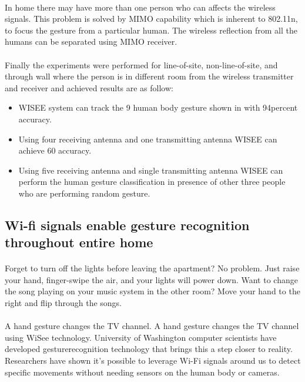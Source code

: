 \documentclass[a4paper,12pt,oneside]{article}
\begin{document}
\paragraph{}
In home there may have more than one person who can affects the wireless signals. This
problem is solved by MIMO capability which is inherent to 802.11n, to focus the gesture from a
particular human. The wireless reflection from all the humans can be separated using MIMO
receiver.
\paragraph{}
Finally the experiments were performed for line-of-site, non-line-of-site, and through
wall where the person is in different room from the wireless transmitter and receiver and
achieved results are as follow:
\begin{itemize}
    \item WISEE system can track the 9 human body gesture shown in with 94percent accuracy.
    \item  Using four receiving antenna and one transmitting antenna WISEE can achieve 60%
accuracy.
    \item Using five receiving antenna and single transmitting antenna WISEE can perform the
human gesture classification in presence of other three people who are performing
random gesture.
\end{itemize}

\subsection{Wi-fi signals enable gesture recognition throughout entire home}
\paragraph{}
Forget to turn off the lights before leaving the apartment? No problem. Just raise your
hand, finger-swipe the air, and your lights will power down. Want to change the song playing on
your music system in the other room? Move your hand to the right and flip through the songs.
\paragraph{}
A hand gesture changes the TV channel. A hand gesture changes the TV channel using
WiSee technology. University of Washington computer scientists have developed gesturerecognition
technology that brings this a step closer to reality. Researchers have shown it’s
possible to leverage Wi-Fi signals around us to detect specific movements without needing
sensors on the human body or cameras.
\end{document}
